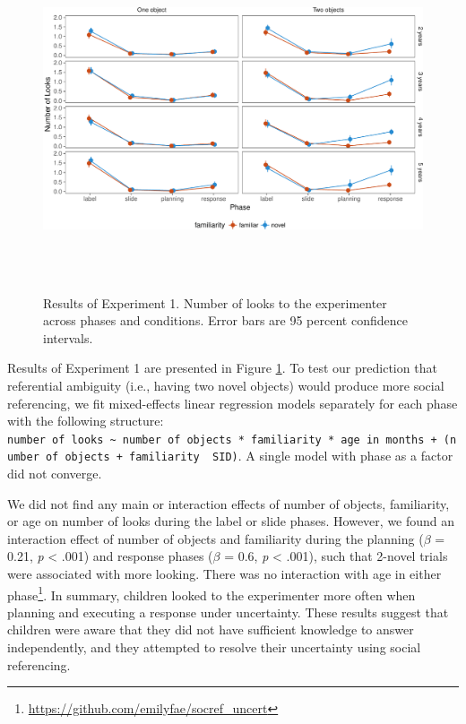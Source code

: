 \documentclass[10pt, letterpaper]{article}
\newenvironment{CodeChunk}{}{}
\begin{document}
\begin{CodeChunk}
\begin{figure}[h]

{\centering \includegraphics[width=6.5in,height=4in]{figs/results_e1-1} 

}

\caption[Results of Experiment 1]{Results of Experiment 1. Number of looks to the experimenter across phases and conditions. Error bars are 95 percent confidence intervals.}\label{fig:results_e1}
\end{figure}
\end{CodeChunk}

Results of Experiment 1 are presented in Figure \ref{fig:results_e1}. To
test our prediction that referential ambiguity (i.e., having two novel
objects) would produce more social referencing, we fit mixed-effects
linear regression models separately for each phase with the following
structure:
\texttt{number\ of\ looks\ \textasciitilde{}\ number\ of\ objects\ *\ familiarity\ *\ age\ in\ months\ +\ (number\ of\ objects\ +\ familiarity\ \textbar{}\ SID)}.
A single model with phase as a factor did not converge.

We did not find any main or interaction effects of number of objects,
familiarity, or age on number of looks during the label or slide phases.
However, we found an interaction effect of number of objects and
familiarity during the planning (\(\beta\) = 0.21, \emph{p} \textless{}
.001) and response phases (\(\beta\) = 0.6, \emph{p} \textless{} .001),
such that 2-novel trials were associated with more looking. There was no
interaction with age in either phase\footnote{\url{https://github.com/emilyfae/socref_uncert}}.
In summary, children looked to the experimenter more often when planning
and executing a response under uncertainty. These results suggest that
children were aware that they did not have sufficient knowledge to
answer independently, and they attempted to resolve their uncertainty
using social referencing.
\end{document}
